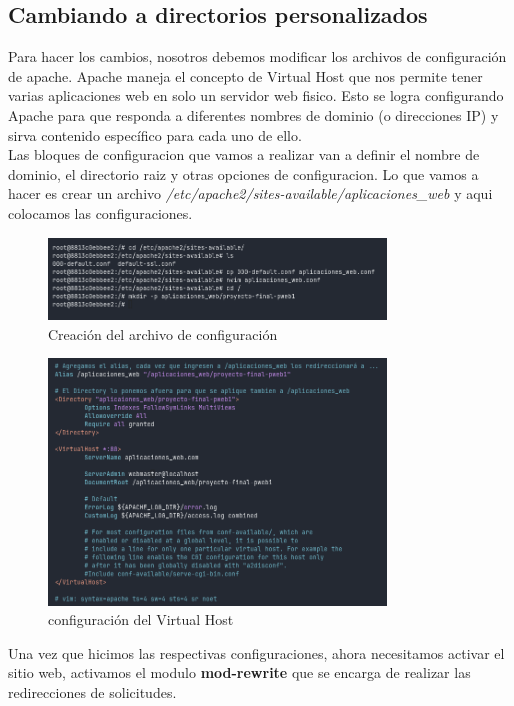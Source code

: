 \subsection{Cambiando a directorios personalizados}
Para hacer los cambios, nosotros debemos modificar los archivos de configuración de apache. Apache 
maneja el concepto de Virtual Host que nos permite tener varias aplicaciones web en solo un servidor 
web fisico. Esto se logra configurando Apache para que responda a diferentes nombres de dominio (o direcciones IP) y sirva contenido específico para cada uno de ello.\\

Las bloques de configuracion que vamos a realizar van a definir el nombre de dominio, el directorio raiz y 
otras opciones de configuracion. Lo que vamos a hacer es crear un archivo \textit{/etc/apache2/sites-available/aplicaciones\_web} y aqui colocamos las configuraciones.

\begin{figure}[H]
  \centering
  \includegraphics[width=0.8\textwidth]{img/directories.png}
  \caption{Creación del archivo de configuración}
\end{figure}

\begin{figure}[H]
  \centering
  \includegraphics[width=0.8\textwidth]{img/conf.png}
  \caption{configuración del Virtual Host}
\end{figure}

Una vez que hicimos las respectivas configuraciones, ahora necesitamos activar el sitio web, activamos el modulo \textbf{mod-rewrite} que se encarga de realizar las redirecciones de solicitudes.

